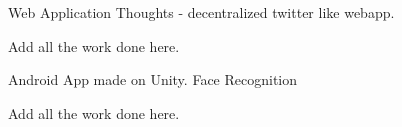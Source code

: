 

\begin{cventries}

 
    \cventry
    {Web Application} %
    {Thoughts - decentralized twitter like webapp.} %
    {} %
    {} %
    {
      \begin{cvitems} %
        \item {Add all the work done here. }
      \end{cvitems}
    }

 
  \cventry
    {Android App made on Unity.} %
    {Face Recognition} %
    {} %
    {} %
    {
      \begin{cvitems} %
        \item {Add all the work done here. }
      \end{cvitems}
    }


    

\end{cventries}
